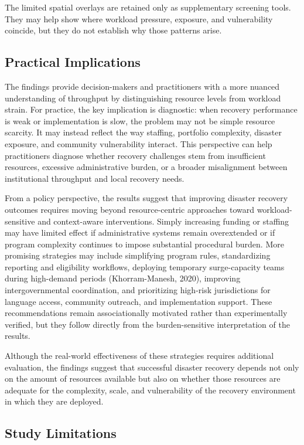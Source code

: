 \documentclass[
  number]{elsarticle}
\begin{document}
The limited spatial overlays are retained only as supplementary
screening tools. They may help show where workload pressure, exposure,
and vulnerability coincide, but they do not establish why those patterns
arise.

\subsection{Practical Implications}\label{practical-implications}

The findings provide decision-makers and practitioners with a more
nuanced understanding of throughput by distinguishing resource levels
from workload strain. For practice, the key implication is diagnostic:
when recovery performance is weak or implementation is slow, the problem
may not be simple resource scarcity. It may instead reflect the way
staffing, portfolio complexity, disaster exposure, and community
vulnerability interact. This perspective can help practitioners diagnose
whether recovery challenges stem from insufficient resources, excessive
administrative burden, or a broader misalignment between institutional
throughput and local recovery needs.

From a policy perspective, the results suggest that improving disaster
recovery outcomes requires moving beyond resource-centric approaches
toward workload-sensitive and context-aware interventions. Simply
increasing funding or staffing may have limited effect if administrative
systems remain overextended or if program complexity continues to impose
substantial procedural burden. More promising strategies may include
simplifying program rules, standardizing reporting and eligibility
workflows, deploying temporary surge-capacity teams during high-demand
periods (Khorram-Manesh, 2020), improving intergovernmental
coordination, and prioritizing high-risk jurisdictions for language
access, community outreach, and implementation support. These
recommendations remain associationally motivated rather than
experimentally verified, but they follow directly from the
burden-sensitive interpretation of the results.

Although the real-world effectiveness of these strategies requires
additional evaluation, the findings suggest that successful disaster
recovery depends not only on the amount of resources available but also
on whether those resources are adequate for the complexity, scale, and
vulnerability of the recovery environment in which they are deployed.

\subsection{Study Limitations}\label{study-limitations}
\end{document}
